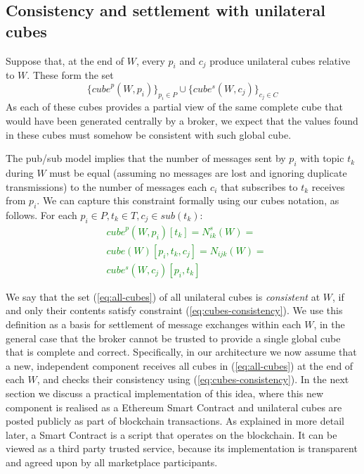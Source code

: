 \documentclass[chi_draft]{sigchi}
\begin{document}
\subsection{Consistency and settlement with unilateral cubes}

Suppose that, at the end of $W$, every $p_i$ and $c_j$ produce  unilateral cubes relative to $W$. 
These form the set
\begin{equation}\label{eq:all-cubes}
\{ \mathit{cube}^p(W, p_i) \}_{p_i \in P}\cup \{\mathit{cube^s}(W, c_j) \}_{c_j \in C} 
\end{equation}
As each of these cubes provides a partial view of the same complete cube that would have been generated centrally by a broker, we expect that the values found in these cubes must somehow be consistent with such global cube.

The pub/sub model implies that the number of messages sent by $p_i$ with topic $t_k$ during $W$ must be equal (assuming no messages are lost and ignoring duplicate transmissions) to the number of messages each $c_i$ that subscribes to $t_k$ receives from $p_i$. 
We can capture this constraint formally using our cubes notation, as follows.
%
For each $ p_i \in P, t_k \in T, c_j \in \mathit{sub}(t_k)$:
\textcolor{green}{\begin{equation}\label{eq:cubes-consistency}
\begin{split}
& \mathit{cube}^p(W, p_i)[t_k] = N^s_{ik}(W) = \\
& \mathit{cube}(W)[p_i, t_k, c_j]  = N_{ijk}(W) = \\
& \mathit{cube^s}(W, c_j)[p_i, t_k]
\end{split}
\end{equation}}

We say that the set (\ref{eq:all-cubes}) of all unilateral cubes is \textit{consistent} at $W$, if and only their contents satisfy constraint (\ref{eq:cubes-consistency}).
We use this definition as a basis for settlement of message exchanges within each $W$, in the general case that the broker cannot be trusted to provide a single global cube that is complete and correct.
%
Specifically, in our architecture we  now assume that a new, independent component receives all cubes in (\ref{eq:all-cubes}) at the end of each $W$, and checks their consistency using (\ref{eq:cubes-consistency}). 
In the next section we discuss a practical implementation of this idea, where this new component is realised as a Ethereum Smart Contract and unilateral cubes are posted publicly as part of blockchain transactions. As explained in more detail later, a Smart Contract is a script that operates on the blockchain. It can be viewed as a third party trusted service, because its implementation is transparent and agreed upon by all marketplace participants. 
\end{document}

